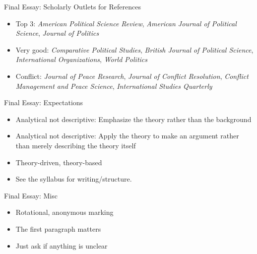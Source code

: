 \documentclass{beamer}
\begin{document}
\begin{frame}{Final Essay: Scholarly Outlets for References}
    \begin{itemize}
        \pause\item Top 3: \emph{American Political Science Review}, \emph{American Journal of Political Science}, \emph{Journal of Politics}
        \pause\item Very good: \emph{Comparative Political Studies}, \emph{British Journal of Political Science}, \emph{International Organizations}, \emph{World Politics}
        \pause\item Conflict: \emph{Journal of Peace Research}, \emph{Journal of Conflict Resolution}, \emph{Conflict Management and Peace Science}, \emph{International Studies Quarterly}
    \end{itemize}
\end{frame}

\begin{frame}{Final Essay: Expectations}
    \begin{itemize}
        \pause\item Analytical not descriptive: Emphasize the theory rather than the background
        \pause\item Analytical not descriptive: Apply the theory to make an argument rather than merely describing the theory itself
        \pause\item Theory-driven, theory-based
        \pause\item See the syllabus for writing/structure.
    \end{itemize}
\end{frame}

\begin{frame}{Final Essay: Misc}
    \begin{itemize}
        \pause\item Rotational, anonymous marking
        \pause\item The first paragraph matters
        \pause\item Just ask if anything is unclear
    \end{itemize}
\end{frame}
\end{document}
